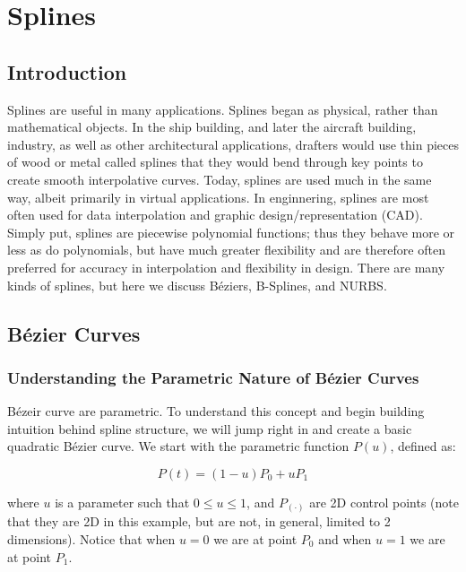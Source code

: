 


	
\chapter{Splines}
\label{ch:splines}


\section{Introduction}
\label{sec:splinesintro}

Splines are useful in many applications. Splines began as physical, rather than mathematical objects. In the ship building, and later the aircraft building, industry, as well as other architectural applications, drafters would use thin pieces of wood or metal called splines that they would bend through key points to create smooth interpolative curves.  Today, splines are used much in the same way, albeit primarily in virtual applications.  In enginnering, splines are most often used for data interpolation and graphic design/representation (CAD). Simply put, splines are piecewise polynomial functions; thus they behave more or less as do polynomials, but have much greater flexibility and are therefore often preferred for accuracy in interpolation and flexibility in design. There are many kinds of splines, but here we discuss Béziers, B-Splines, and NURBS.

\section{Bézier Curves}
\subsection{Understanding the Parametric Nature of Bézier Curves}
Bézeir curve are parametric.  To understand this concept and begin building intuition behind spline structure, we will jump right in and create a basic quadratic Bézier curve. We start with the parametric function $P(u)$, defined as:

\begin{equation}
\label{eq:parametricrelation}
P(t) = (1-u)P_0 + uP_1
\end{equation}

where $u$ is a parameter such that $0 \leq u \leq 1$, and $P_{(\cdot)}$ are 2D control points (note that they are 2D in this example, but are not, in general, limited to 2 dimensions). Notice that when $u=0$ we are at point $P_0$ and when $u=1$ we are at point $P_1$. 

